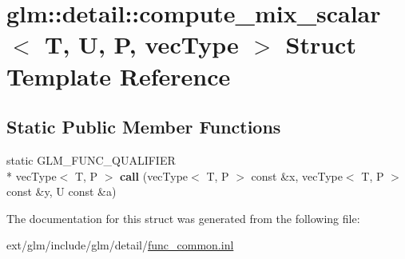 \hypertarget{structglm_1_1detail_1_1compute__mix__scalar}{\section{glm\-:\-:detail\-:\-:compute\-\_\-mix\-\_\-scalar$<$ T, U, P, vec\-Type $>$ Struct Template Reference}
\label{structglm_1_1detail_1_1compute__mix__scalar}
}
\subsection*{Static Public Member Functions}
\begin{DoxyCompactItemize}
\item 
\hypertarget{structglm_1_1detail_1_1compute__mix__scalar_a15fb89e5dac67f6645419fd7eaebdc5f}{static G\-L\-M\-\_\-\-F\-U\-N\-C\-\_\-\-Q\-U\-A\-L\-I\-F\-I\-E\-R \\*
vec\-Type$<$ T, P $>$ {\bfseries call} (vec\-Type$<$ T, P $>$ const \&x, vec\-Type$<$ T, P $>$ const \&y, U const \&a)}\label{structglm_1_1detail_1_1compute__mix__scalar_a15fb89e5dac67f6645419fd7eaebdc5f}

\end{DoxyCompactItemize}


The documentation for this struct was generated from the following file\-:\begin{DoxyCompactItemize}
\item 
ext/glm/include/glm/detail/\hyperlink{func__common_8inl}{func\-\_\-common.\-inl}\end{DoxyCompactItemize}
